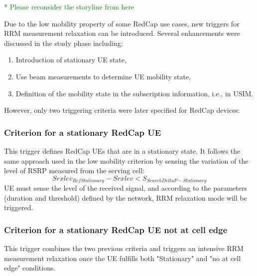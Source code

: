 \documentclass[]{IEEEtran}
\newcommand{\CAREPL}[2]{\textcolor{red}{#1}\textcolor{green}{#2}}
\begin{document}
\CAREPL{}{* Please reconsider the storyline from here}

Due to the low mobility property of some RedCap use cases, new triggers for RRM measurement relaxation can be introduced. Several enhancements were discussed in the study phase including:
\begin{enumerate}
    \item Introduction of stationary UE state,
    \item Use beam measurements to determine UE mobility state,
    \item Definition of the mobility state in the subscription information, i.e., in USIM.
\end{enumerate}
However, only two triggering criteria were later specified for RedCap devices:\\
\subsubsection{\textbf{Criterion for a stationary RedCap UE}} This trigger defines RedCap UEs that are in a stationary state. It follows the same approach used in the low mobility criterion by sensing the variation of the level of RSRP measured from the serving cell:
\begin{equation}
Srxlev_{RefStationary}-Srxlev<S_{SearchDeltaP-Stationary}
\label{equ:stationary-criterion}
\end{equation}
UE must sense the level of the received signal, and according to the parameters (duration and threshold) defined by the network, RRM relaxation mode will be triggered. 

\subsubsection{\textbf{Criterion for a stationary RedCap UE not at cell edge}} This trigger combines the two previous criteria and triggers an intensive RRM measurement relaxation once the UE fulfills both "Stationary" and "no at cell edge" conditions. \\
\end{document}
